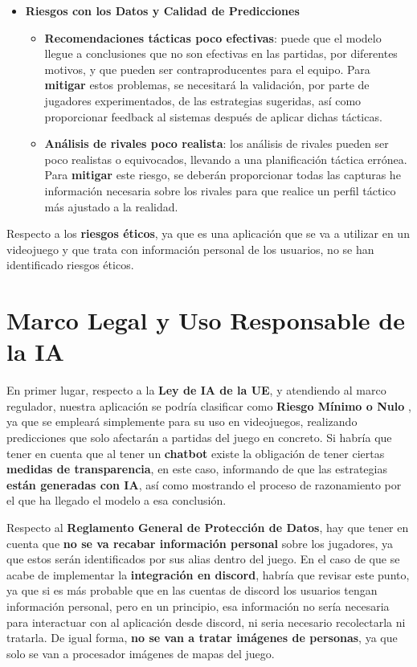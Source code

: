 \begin{itemize}
	\item \textbf{Riesgos con los Datos y Calidad de Predicciones}
	\begin{itemize}
		\item \textbf{Recomendaciones tácticas poco efectivas}: puede que el modelo llegue a conclusiones que no son efectivas en las partidas, por diferentes motivos, y que pueden ser contraproducentes para el equipo. Para \textbf{mitigar} estos problemas, se necesitará la validación, por parte de jugadores experimentados, de las estrategias sugeridas, así como proporcionar feedback al sistemas después de aplicar dichas tácticas.
		\item \textbf{Análisis de rivales poco realista}: los análisis de rivales pueden ser poco realistas o equivocados, llevando a una planificación táctica errónea. Para \textbf{mitigar} este riesgo, se deberán proporcionar todas las capturas he información necesaria sobre los rivales para que realice un perfil táctico más ajustado a la realidad.                  
	\end{itemize}
\end{itemize}

Respecto a los \textbf{riesgos éticos}, ya que es una aplicación que se va a utilizar en un videojuego y que trata con información personal de los usuarios, no se han identificado riesgos éticos.

\section{Marco Legal y Uso Responsable de la IA}
En primer lugar, respecto a la \textbf{Ley de IA de la UE}, y atendiendo al marco regulador, nuestra aplicación se podría clasificar como \textbf{Riesgo Mínimo o Nulo} \cite{euai}, ya que se empleará simplemente para su uso en videojuegos, realizando predicciones que solo afectarán a partidas del juego en concreto. Si habría que tener en cuenta que al tener un \textbf{chatbot} existe la obligación de tener ciertas \textbf{medidas de transparencia}, en este caso, informando de que las estrategias \textbf{están generadas con IA}, así como mostrando el proceso de razonamiento por el que ha llegado el modelo a esa conclusión.

Respecto al \textbf{Reglamento General de Protección de Datos}, hay que tener en cuenta que \textbf{no se va recabar información personal} sobre los jugadores, ya que estos serán identificados por sus alias dentro del juego. En el caso de que se acabe de implementar la \textbf{integración en discord}, habría que revisar este punto, ya que si es más probable que en las cuentas de discord los usuarios tengan información personal, pero en un principio, esa información no sería necesaria para interactuar con al aplicación desde discord, ni seria necesario recolectarla ni tratarla. De igual forma, \textbf{no se van a tratar imágenes de personas}, ya que solo se van a procesador imágenes de mapas del juego.

